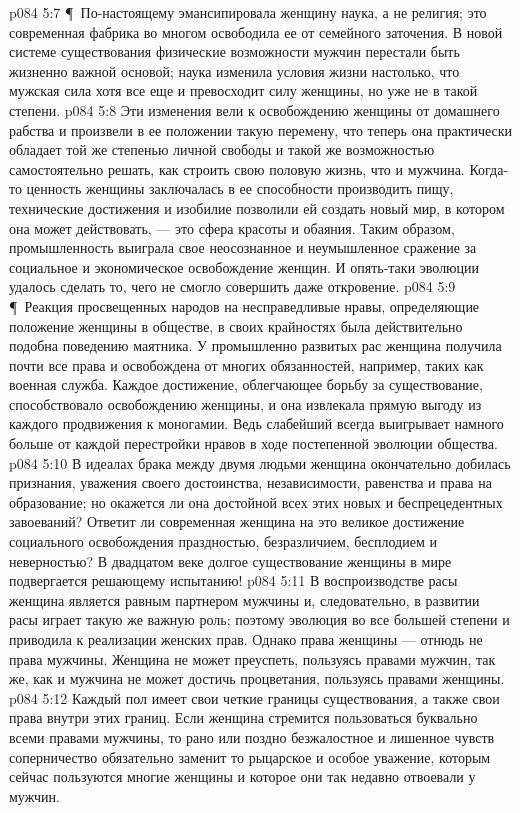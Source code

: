 \vs p084 5:7 \P\ По\hyp{}настоящему эмансипировала женщину наука, а не религия; это современная фабрика во многом освободила ее от семейного заточения. В новой системе существования физические возможности мужчин перестали быть жизненно важной основой; наука изменила условия жизни настолько, что мужская сила хотя все еще и превосходит силу женщины, но уже не в такой степени.
\vs p084 5:8 Эти изменения вели к освобождению женщины от домашнего рабства и произвели в ее положении такую перемену, что теперь она практически обладает той же степенью личной свободы и такой же возможностью самостоятельно решать, как строить свою половую жизнь, что и мужчина. Когда\hyp{}то ценность женщины заключалась в ее способности производить пищу, технические достижения и изобилие позволили ей создать новый мир, в котором она может действовать, --- это сфера красоты и обаяния. Таким образом, промышленность выиграла свое неосознанное и неумышленное сражение за социальное и экономическое освобождение женщин. И опять\hyp{}таки эволюции удалось сделать то, чего не смогло совершить даже откровение.
\vs p084 5:9 \P\ Реакция просвещенных народов на несправедливые нравы, определяющие положение женщины в обществе, в своих крайностях была действительно подобна поведению маятника. У промышленно развитых рас женщина получила почти все права и освобождена от многих обязанностей, например, таких как военная служба. Каждое достижение, облегчающее борьбу за существование, способствовало освобождению женщины, и она извлекала прямую выгоду из каждого продвижения к моногамии. Ведь слабейший всегда выигрывает намного больше от каждой перестройки нравов в ходе постепенной эволюции общества.
\vs p084 5:10 В идеалах брака между двумя людьми женщина окончательно добилась признания, уважения своего достоинства, независимости, равенства и права на образование; но окажется ли она достойной всех этих новых и беспрецедентных завоеваний? Ответит ли современная женщина на это великое достижение социального освобождения праздностью, безразличием, бесплодием и неверностью? В двадцатом веке долгое существование женщины в мире подвергается решающему испытанию!
\vs p084 5:11 В воспроизводстве расы женщина является равным партнером мужчины и, следовательно, в развитии расы играет такую же важную роль; поэтому эволюция во все большей степени и приводила к реализации женских прав. Однако права женщины --- отнюдь не права мужчины. Женщина не может преуспеть, пользуясь правами мужчин, так же, как и мужчина не может достичь процветания, пользуясь правами женщины.
\vs p084 5:12 Каждый пол имеет свои четкие границы существования, а также свои права внутри этих границ. Если женщина стремится пользоваться буквально всеми правами мужчины, то рано или поздно безжалостное и лишенное чувств соперничество обязательно заменит то рыцарское и особое уважение, которым сейчас пользуются многие женщины и которое они так недавно отвоевали у мужчин.
